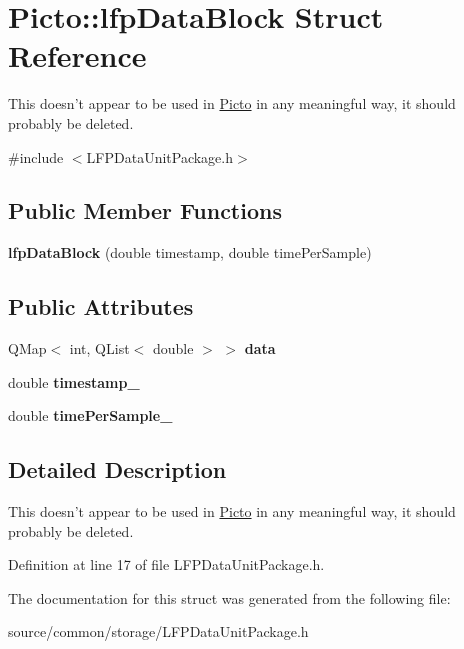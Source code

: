 \hypertarget{struct_picto_1_1lfp_data_block}{\section{Picto\-:\-:lfp\-Data\-Block Struct Reference}
\label{struct_picto_1_1lfp_data_block}
}


This doesn't appear to be used in \hyperlink{namespace_picto}{Picto} in any meaningful way, it should probably be deleted.  




{\ttfamily \#include $<$L\-F\-P\-Data\-Unit\-Package.\-h$>$}

\subsection*{Public Member Functions}
\begin{DoxyCompactItemize}
\item 
\hypertarget{struct_picto_1_1lfp_data_block_a1269575faee74d1999c41303ebf94846}{{\bfseries lfp\-Data\-Block} (double timestamp, double time\-Per\-Sample)}\label{struct_picto_1_1lfp_data_block_a1269575faee74d1999c41303ebf94846}

\end{DoxyCompactItemize}
\subsection*{Public Attributes}
\begin{DoxyCompactItemize}
\item 
\hypertarget{struct_picto_1_1lfp_data_block_a04c19503a95da0d1ee320422ecdba2d1}{Q\-Map$<$ int, Q\-List$<$ double $>$ $>$ {\bfseries data}}\label{struct_picto_1_1lfp_data_block_a04c19503a95da0d1ee320422ecdba2d1}

\item 
\hypertarget{struct_picto_1_1lfp_data_block_a6ca717edcca63df8e89c9eff470fa46d}{double {\bfseries timestamp\-\_\-}}\label{struct_picto_1_1lfp_data_block_a6ca717edcca63df8e89c9eff470fa46d}

\item 
\hypertarget{struct_picto_1_1lfp_data_block_a4e0c92cd0654bf014e8315c99409b910}{double {\bfseries time\-Per\-Sample\-\_\-}}\label{struct_picto_1_1lfp_data_block_a4e0c92cd0654bf014e8315c99409b910}

\end{DoxyCompactItemize}


\subsection{Detailed Description}
This doesn't appear to be used in \hyperlink{namespace_picto}{Picto} in any meaningful way, it should probably be deleted. 

Definition at line 17 of file L\-F\-P\-Data\-Unit\-Package.\-h.



The documentation for this struct was generated from the following file\-:\begin{DoxyCompactItemize}
\item 
source/common/storage/L\-F\-P\-Data\-Unit\-Package.\-h\end{DoxyCompactItemize}

